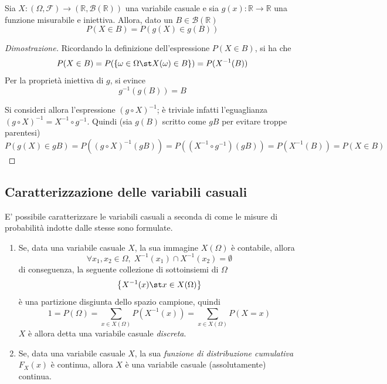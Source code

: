         \begin{lemma}
            Sia $X: (\Omega, \mathcal{F}) \rightarrow (\mathbb{R}, \mathcal{B}(\mathbb{R}))$ una variabile casuale e sia $g(x): \mathbb{R} \rightarrow \mathbb{R}$ una funzione misurabile e iniettiva.
            Allora, dato un $B \in \mathcal{B}(\mathbb{R})$
            \[
                P(X \in B) = P(g(X) \in g(B))
            \]
        \end{lemma}

        \begin{proof}[Dimostrazione]
            Ricordando la definizione dell'espressione $P(X \in B)$, si ha che
            \[
                P(X \in B) = P(\{ \omega \in \Omega \st X(\omega) \in B \}) = P(X^{-1}(B))
            \]
            Per la proprietà iniettiva di $g$, si evince
            \[
                g^{-1}(g(B)) = B
            \]

            Si consideri allora l'espressione $(g \circ X)^{-1}$; è triviale infatti l'eguaglianza $(g \circ X)^{-1} = X^{-1} \circ g^{-1}$.
            Quindi (sia $g(B)$ scritto come $gB$ per evitare troppe parentesi)
            \[
                P(g(X) \in gB) = P((g \circ X)^{-1}(gB)) = P((X^{-1} \circ g^{-1}) (gB)) = P(X^{-1}(B)) = P(X \in B)
            \]
        \end{proof}


        \subsection{Caratterizzazione delle variabili casuali}
            E' possibile caratterizzare le variabili casuali a seconda di come le misure di probabilità indotte dalle stesse sono formulate.

            \begin{enumerate}
                \item Se, data una variabile casuale $X$, la sua immagine $X(\Omega)$ è contabile, allora
                \[
                    \forall x_1, x_2 \in \Omega, \; X^{-1}(x_1) \cap X^{-1}(x_2) = \emptyset
                \]
                di conseguenza, la seguente collezione di sottoinsiemi di $\Omega$
                \[
                    \left\{X^{-1}(x) \st x \in X(\Omega)\right\}
                \]
                è una partizione disgiunta dello spazio campione, quindi
                \[
                    1 = P(\Omega) = \sum_{x \in X(\Omega)} P(X^{-1}(x)) = \sum_{x \in X(\Omega)} P(X = x)
                \]
                $X$ è allora detta una variabile casuale \textit{discreta}.

                \item Se, data una variabile casuale $X$, la sua \textit{funzione di distribuzione cumulativa} $F_{X}(x)$ è continua, allora $X$ è una variabile casuale (assolutamente) continua.
            \end{enumerate}

